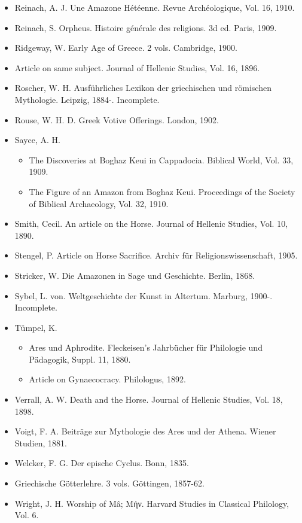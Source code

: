 \documentclass[a4paper, 12pt, oneside]{article}
\begin{document}
\begin{itemize}
    \item Reinach, A. J. Une Amazone Hétéenne. Revue Archéologique, Vol. 16, 1910.
    \item Reinach, S. Orpheus. Histoire générale des religions. 3d ed. Paris, 1909.
    \item Ridgeway, W. Early Age of Greece. 2 vols. Cambridge, 1900.  
    \item Article on same subject. Journal of Hellenic Studies, Vol. 16, 1896.
    \item Roscher, W. H. Ausführliches Lexikon der griechischen und römischen Mythologie. Leipzig, 1884-. Incomplete.
    \item Rouse, W. H. D. Greek Votive Offerings. London, 1902.
    \item Sayce, A. H.
    \begin{itemize}
        \item The Discoveries at Boghaz Keui in Cappadocia. Biblical World, Vol. 33, 1909.
        \item The Figure of an Amazon from Boghaz Keui. Proceedings of the Society of Biblical Archaeology, Vol. 32, 1910.
    \end{itemize}
    \item Smith, Cecil. An article on the Horse. Journal of Hellenic Studies, Vol. 10, 1890.
    \item Stengel, P. Article on Horse Sacrifice. Archiv für Religionswissenschaft, 1905.
    \item Stricker, W. Die Amazonen in Sage und Geschichte. Berlin, 1868.
    \item Sybel, L. von. Weltgeschichte der Kunst in Altertum. Marburg, 1900-. Incomplete.
    \item Tümpel, K. 
    \begin{itemize}
        \item Ares und Aphrodite. Fleckeisen's Jahrbücher für Philologie und Pädagogik, Suppl. 11, 1880.
        \item Article on Gynaecocracy. Philologus, 1892.
    \end{itemize}
    \item Verrall, A. W. Death and the Horse. Journal of Hellenic Studies, Vol. 18, 1898.
    \item Voigt, F. A. Beiträge zur Mythologie des Ares und der Athena. Wiener Studien, 1881.
    \item Welcker, F. G. Der epische Cyclus. Bonn, 1835.  
    \item Griechische Götterlehre. 3 vols. Göttingen, 1857-62.
    \item Wright, J. H. Worship of Mâ; Μήν. Harvard Studies in Classical Philology, Vol. 6.
\end{itemize}
\end{document}
